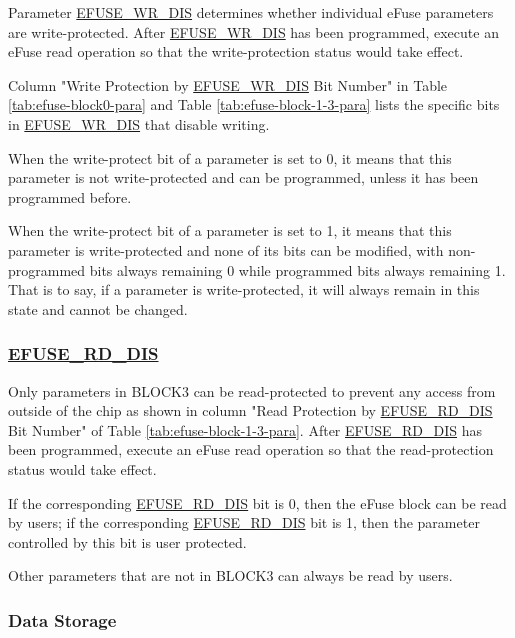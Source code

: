 \documentclass[main\_\_EN.tex]{subfiles}
\begin{document}
Parameter \hyperref[fielddesc:EFUSEWRDIS]{EFUSE\_WR\_DIS} determines whether individual eFuse parameters are write-protected. After \hyperref[fielddesc:EFUSEWRDIS]{EFUSE\_WR\_DIS} has been programmed, execute an eFuse read operation so that the write-protection status would take effect.

Column "Write Protection by \hyperref[fielddesc:EFUSEWRDIS]{EFUSE\_WR\_DIS} Bit Number" in Table \ref{tab:efuse-block0-para} and Table \ref{tab:efuse-block-1-3-para} lists the specific bits in \hyperref[fielddesc:EFUSEWRDIS]{EFUSE\_WR\_DIS} that disable writing.

When the write-protect bit of a parameter is set to 0, it means that this parameter is not write-protected and can be programmed, unless it has been programmed before.

When the write-protect bit of a parameter is set to 1, it means that this parameter is write-protected and none of its bits can be modified, with non-programmed bits always remaining 0 while programmed bits always remaining 1. That is to say, if a parameter is write-protected, it will always remain in this state and cannot be changed.

\subsubsection{\hyperref[fielddesc:EFUSERDDIS]{EFUSE\_RD\_DIS}}
\label{sec:efuse-rd-dis}

Only parameters in BLOCK3 can be read-protected to prevent any access from outside of the chip as shown in column "Read Protection by \hyperref[fielddesc:EFUSERDDIS]{EFUSE\_RD\_DIS} Bit Number" of Table \ref{tab:efuse-block-1-3-para}. After \hyperref[fielddesc:EFUSEWRDIS]{EFUSE\_RD\_DIS} has been programmed, execute an eFuse read operation so that the read-protection status would take effect.

If the corresponding \hyperref[fielddesc:EFUSERDDIS]{EFUSE\_RD\_DIS} bit is 0, then the eFuse block can be read by users; if the corresponding \hyperref[fielddesc:EFUSERDDIS]{EFUSE\_RD\_DIS} bit is 1, then the parameter controlled by this bit is user protected.

Other parameters that are not in BLOCK3 can always be read by users.


\subsubsection{Data Storage}
\label{sec:efuse-data-storage}
\end{document}
